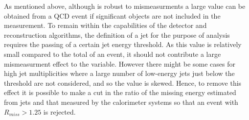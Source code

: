 As mentioned above, although \alt is robust to mismeasurments a large value can be obtained from a QCD event if significant objects are not included in the measurement. To remain within the capabilities of the detector and reconstruction algorithms, the definition of a jet for the purpose of analysis requires the passing of a certain jet energy threshold. As this value is relatively small compared to the total \HT of an event, it should not contribute a large mismeasurment effect to the \alt variable. However there might be some cases for high jet multiplicities where a large number of low-energy jets just below the threshold are not considered, and so the \alt value is skewed. Hence, to remove this effect it is possible to make a cut in the ratio of the missing energy estimated from jets \mht and that measured by the calorimeter systems \met so that an event with $R_{miss} > 1.25$ is rejected. 
